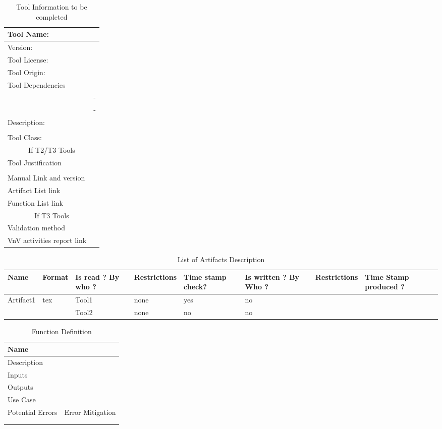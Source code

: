 \begin{table}[htbp]
\centering
\caption{\label{tbl:tool-info}Tool Information to be completed}
\begin{tabular}{|l|p{5cm}|}\hline
Tool Name: & \\\hline
Version: & \\\hline
Tool License: & \\\hline
Tool Origin: &\\\hline
Tool Dependencies & \\
 & -\\
 & -\\ \hline
Description: & \\
 & \\ \hline
Tool Class: & \\\hline
\multicolumn{2}{|c|}{If T2/T3 Tools}\\\hline
Tool Justification & \\
 & \\ \hline
Manual Link and version & \\\hline
Artifact List link & \\\hline
Function List link& \\\hline
\multicolumn{2}{|c|}{If T3 Tools}\\\hline
Validation method& \\\hline
VnV activities report link&\\\hline
\end{tabular}
\end{table}


\begin{table}[htbp]
\caption{\label{tbl:artifacts} List of  Artifacts Description}
{\small
\begin{tabular}{|p{4em}|l|p{1.5cm}|l|p{5em}|p{1.8cm}|l|p{5em}|}\hline
Name & Format & Is read ? By who ?& Restrictions & Time stamp check? &Is
written ? By Who ?& Restrictions & Time Stamp produced ?\\\hline
\multirow{2}{*}{Artifact1} & \multirow{2}{*}{tex} & Tool1 & none & yes &no & &\\\cline{3-8}
                           & & Tool2 & none& no & no & &\\\hline
\end{tabular}
}
\end{table}


\begin{table}[htbp]
\centering
\caption{\label{tbl:functions} Function Definition}
\begin{tabular}{|p{5cm}|p{5cm}|}\hline
Name&\\\hline
Description& \\\hline
Inputs & \\\hline
Outputs & \\\hline
Use Case & \\\hline\hline
Potential Errors & Error Mitigation \\\hline
&  \\\hline
&  \\\hline
\end{tabular}
\end{table}




